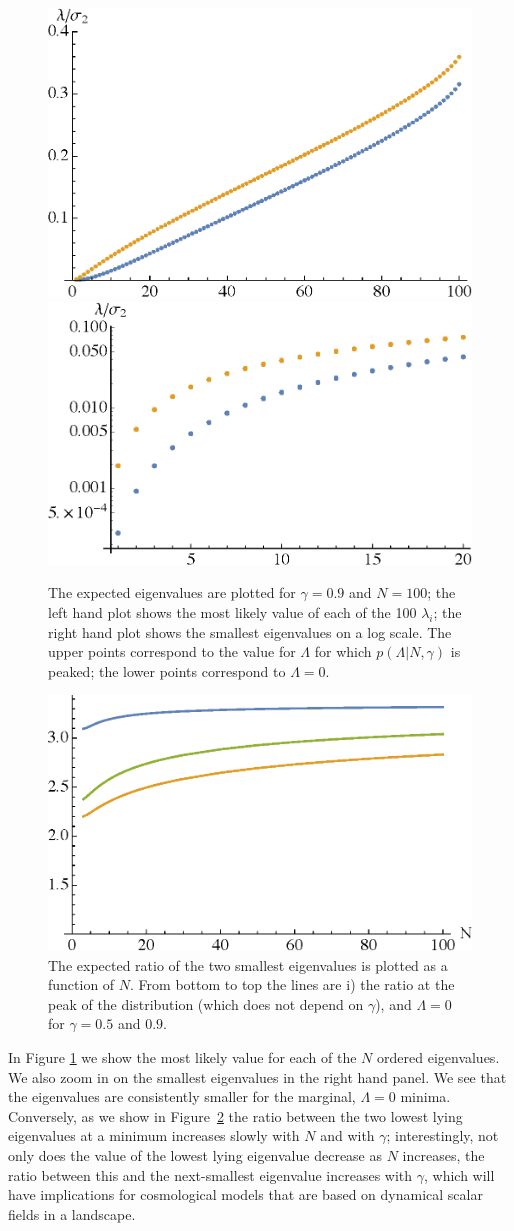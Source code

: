 \documentclass[12pt]{article}
\begin{document}
\begin{figure} 
  \centering
  \includegraphics[width=.45\linewidth]{l1_100.eps} \hfill \includegraphics[width=.45\linewidth]{l2_100.eps}
  \caption{The expected eigenvalues are plotted for $\gamma=0.9$ and $N=100$; the left hand plot shows the most likely value of each of the 100 $\lambda_i$; the right hand plot shows the smallest eigenvalues on a log scale. The upper points correspond to the value for $\Lambda$ for which $p(\Lambda| N,\gamma)$  is peaked; the lower points correspond to $\Lambda=0$.}
  \label{eigendist2}
\end{figure}
 
\begin{figure} 
  \centering
  \includegraphics[width=.6\linewidth]{ratio.eps}  
  \caption{The expected ratio of the two smallest eigenvalues is plotted as a function of $N$.   From bottom to top the lines are i) the ratio at the peak  of the distribution (which does not depend on $\gamma$), and $\Lambda=0$ for $\gamma =0.5$ and $0.9$.}
  \label{ratio}
\end{figure}


In Figure \ref{eigendist2} we show the most likely value for each of the $N$ ordered eigenvalues. We also zoom in on the smallest eigenvalues in the right hand panel. We see that the eigenvalues are consistently smaller for the marginal, $\Lambda=0$ minima. 
Conversely, as we show in Figure~\ref{ratio} the ratio between the two lowest lying eigenvalues at a minimum increases slowly with $N$ and with $\gamma$; interestingly, not only does the value of the lowest lying eigenvalue decrease as  $N$ increases, the ratio between this and the next-smallest eigenvalue increases with $\gamma$, which will have implications for cosmological models that are based on dynamical scalar fields in a landscape. 
\end{document}
